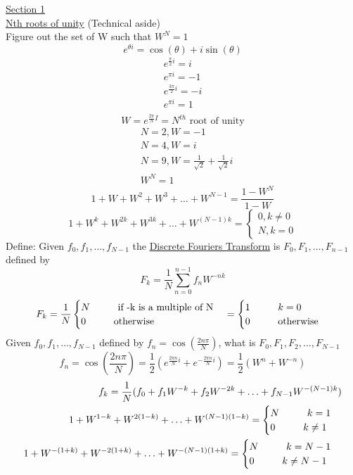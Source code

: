 \documentclass[10pt,usletter]{article}
\newcommand{\tab}[1][1cm]{\hspace*{#1}}
\begin{document}
\underline{Section 1}\\
\underline{Nth roots of unity} (Technical aside)\\
\tab Figure out the set of W such that $W^N=1$
$$e^{\theta i} = \cos(\theta) + i\sin(\theta)$$
\begin{align*}
e^{\frac{\pi}{2}i}=i\\
e^{\pi i}=-1\\
e^{\frac{3\pi}{2}i}=-i\\
e^{\pi i} = 1\\
\end{align*}
$$W=e^{\frac{2\pi}{N}I}= N^{th}\text{ root of unity}$$
\begin{align*}
&N = 2, W=-1\\
&N = 4, W= i\\
&N= 9, W = \frac{1}{\sqrt{2}}+\frac{1}{\sqrt{2}}i\\
&W^N = 1
\end{align*}
$$1+W+W^2+W^3+\hdots+W^{N-1}=\frac{1-W^N}{1-W}$$
$$1+W^k+W^{2k}+W^{3k}+\hdots+W^{(N-1)k}=
\begin{cases}
0,k \not = 0\\
N,k = 0
\end{cases}$$
Define: Given $f_0,f_1,\hdots,f_{N-1}$ the \underline{Discrete Fouriers Transform} is $F_0, F_1,\hdots, F_{n-1}$ defined by $$F_k=\frac{1}{N}\sum_{n=0}^{n-1}f_nW^{-nk}$$
$$F_k=\frac{1}{N}\begin{cases}N \tab\text{if -k is a multiple of N}\\0\tab\text{otherwise}\end{cases}=\begin{cases}1\tab k=0\\0\tab \text{otherwise}\end{cases}$$
Given $f_0,f_1,\hdots,f_{N-1}$ defined by $f_n=\cos(\frac{2n\pi}{N})$, what is $F_0,F_1,F_2,\hdots,F_{N-1}$
$$f_n=\cos(\frac{2n\pi}{N})=\frac{1}{2}(e^{\frac{2\pi n}{N}i}+e^{-\frac{2\pi n}{N}i})=\frac{1}{2}(W^n+W^{-n})$$
\begin{align*}
f_k=\frac{1}{N}(f_0+f_1W^{-k}+f_2W^{-2k}+\hdots+f_{N-1}W^{-(N-1)k})\\
1+W^{1-k}+W^{2(1-k)}+\hdots+W^{(N-1)(1-k)}=\begin{cases}N \tab k=1\\0 \tab k \not= 1\end{cases}\\
1+W^{-(1+k)}+W^{-2(1+k)}+\hdots+W^{-(N-1)(1+k)}=\begin{cases}N \tab k=N-1\\0 \tab k \not= N-1\end{cases}
\end{align*}
\end{document}
